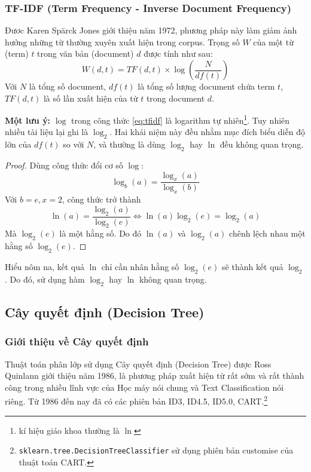 \documentclass[12pt]{article}
\begin{document}
\subsubsection{TF-IDF (Term Frequency - Inverse Document Frequency)}
Đươc Karen Spärck Jones giới thiệu năm 1972\cite{Jones72astatistical}, phương pháp này làm giảm ảnh hưởng những từ thường xuyên xuất hiện trong corpus. Trọng số $W$ của một từ (term) $t$ trong văn bản (document) $d$ được tính như sau:
\begin{equation}\label{eq:tfidf}
W(d, t) = TF(d, t) \times \log\left(\frac{N}{df(t)}\right)
\end{equation}
Với $N$ là tổng số document, $df(t)$ là tổng số lượng document chứa term $t$, $TF(d, t)$ là số lần xuất hiện của từ $t$ trong document $d$.

\textbf{Một lưu ý:}\label{pr:log} $\log$ trong công thức \ref{eq:tfidf} là logarithm tự nhiên\footnote{kí hiệu giáo khoa thường là $\ln$}. Tuy nhiên nhiều tài liệu lại ghi là $\log_2$. Hai khái niệm này đều nhằm mục đích biểu diễn độ lớn của $df(t)$ so với $N$, và thường là dùng $\log_2$ hay $\ln$ đều không quan trọng.

\begin{proof}
Dùng công thức đổi cơ số $\log$:
\begin{equation}
\log_b(a) = \frac{\log_x(a)}{\log_x(b)}
\end{equation}
Với $b = e, x = 2$, công thức trở thành
\begin{equation}
\ln(a) = \frac{\log_2(a)}{\log_2(e)} \iff \ln(a)\log_2(e) = \log_2(a)
\end{equation}
Mà $\log_2(e)$ là một hằng số. Do đó $\ln(a)$ và $\log_2(a)$ chênh lệch nhau một hằng số $\log_2(e)$.
\end{proof}
Hiểu nôm na, kết quả $\ln$ chỉ cần nhân hằng số $\log_2(e)$ sẽ thành kết quả $\log_2$. Do đó, sử dụng hàm $\log_2$ hay $\ln$ không quan trọng.

\subsection{Cây quyết định (Decision Tree)}
\subsubsection{Giới thiệu về Cây quyết định}
Thuật toán phân lớp sử dụng Cây quyết định (Decision Tree) được Ross Quinlann giới thiệu năm 1986\cite{DBLP:journals/ml/Quinlan86}, là phương pháp xuất hiện từ rất sớm và rất thành công trong nhiều lĩnh vực của Học máy nói chung và Text Classification nói riêng. Từ 1986 đến nay đã có các phiên bản ID3, ID4.5, ID5.0, CART.\footnote{\texttt{sklearn.tree.DecisionTreeClassifier} sử dụng phiên bản customise của thuật toán CART.\cite{scikit-learn}}
\end{document}
